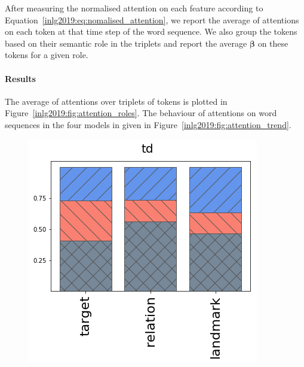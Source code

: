 After measuring the normalised attention on each feature according to
Equation~\ref{inlg2019:eq:nomalised_attention}, we report the average of
attentions on each token at that time step
of the word sequence. We also %
group the tokens based on their semantic role in the triplets and
report the average $\bm{\beta}$ on these tokens for a given role.


\paragraph{Results} The average of %
attentions over triplets of tokens is plotted in
Figure~\ref{inlg2019:fig:attention_roles}. The behaviour of attentions on word
sequences in the four models in given in
Figure~\ref{inlg2019:fig:attention_trend}.


\begin{figure}[ht!]
	\centering
	\begin{minipage}{0.3\linewidth}
		\centering
		\includegraphics[width=\columnwidth]{studies/inlg2019/figures/results/attentions/models/td.png}\\
	\end{minipage}%
	\begin{minipage}{0.3\linewidth}
		\centering

\end{minipage}
\end{figure}
